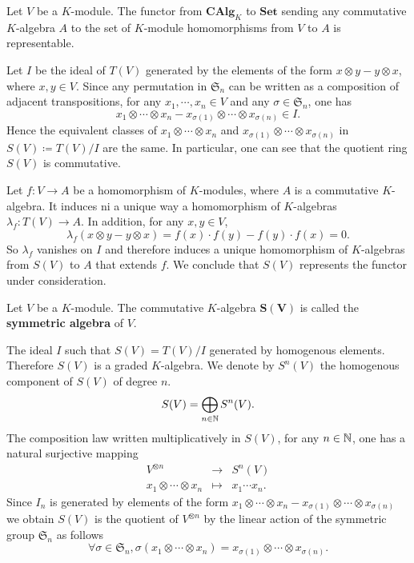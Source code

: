 \begin{theoremenv}
    Let $V$ be a $K$-module.
    The functor from $\mathbf{CAlg}_{K}$ to $\mathbf{Set}$ sending any commutative $K$-algebra $A$ to the set of $K$-module homomorphisms from $V$ to $A$ is representable.
\end{theoremenv}
\begin{proofenv}
    Let $I$ be the ideal of $T(V)$ generated by the elements of the form $x\otimes y - y\otimes x$, where $x,y \in V$.
    Since any permutation in $\mathfrak{S}_{n}$ can be written as a composition of adjacent transpositions, for any $x_1, \cdots, x_n \in V$ and any $\sigma \in \mathfrak{S}_n$, one has
    $$ x_1 \otimes \cdots \otimes x_n - x_{\sigma(1)} \otimes \cdots \otimes x_{\sigma(n)} \in I.$$
    Hence the equivalent classes of $x_1\otimes \cdots \otimes x_n$ and $x_{\sigma(1)} \otimes \cdots \otimes x_{\sigma(n)}$ in $S(V) \coloneq T(V)/I$ are the same.
    In particular, one can see that the quotient ring $S(V)$ is commutative.
    
    \quad Let $f: V \rightarrow A$ be a homomorphism of $K$-modules, where $A$ is a commutative $K$-algebra.
    It induces ni a unique way a homomorphism of $K$-algebras $\lambda_f : T(V) \rightarrow A$.
    In addition, for any $x,y \in V$,
    $$ \lambda_f(x\otimes y - y\otimes x) = f(x) \cdot f(y) - f(y) \cdot f(x) = 0.$$
    So $\lambda_f$ vanishes on $I$ and therefore induces a unique homomorphism of $K$-algebras from $S(V)$ to $A$ that extends $f$.
    We conclude that $S(V)$ represents the functor under consideration.
\end{proofenv}

\begin{definitionenv}
    Let $V$ be a $K$-module.
    The commutative $K$-algebra $\bm{S(V)}$ is called the \textbf{symmetric algebra} of $V$.
\end{definitionenv}

\begin{remark}
    The ideal $I$ such that $S(V) = T(V)/I$ generated by homogenous elements.
    Therefore $S(V)$ is a graded $K$-algebra.
    We denote by $S^n(V)$ the homogenous component of $S(V)$ of degree $n$.
    $$ S(V) = \bigoplus_{n\in \mathbb{N}} S^n(V).$$
    The composition law written multiplicatively in $S(V)$, for any $n\in \mathbb{N}$, one has a natural surjective mapping
    $$ \begin{array}{rcl}
        V^{\otimes n} & \rightarrow & S^n(V)\\
        x_1 \otimes \cdots \otimes x_n & \mapsto & x_1 \cdots x_n.
    \end{array}$$
    Since $I_n$ is generated by elements of the form $x_1 \otimes \cdots \otimes x_n - x_{\sigma(1)} \otimes \cdots \otimes x_{\sigma(n)}$ 
    we obtain $S(V)$ is the quotient of $V^{\otimes n}$ by the linear action of the symmetric group $\mathfrak{S}_n$ as follows
    $$ \forall \sigma \in \mathfrak{S}_n, \sigma (x_1 \otimes \cdots \otimes x_n) = x_{\sigma(1)} \otimes \cdots \otimes x_{\sigma(n)}.$$
\end{remark}

